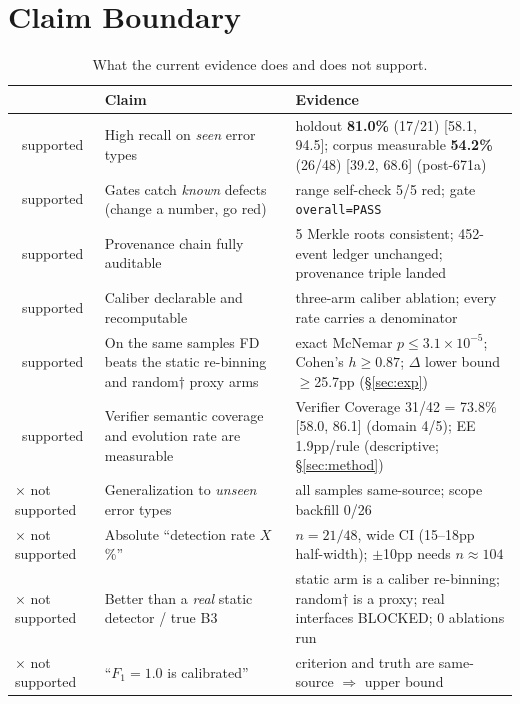 \documentclass{article}
\newcommand{\cmark}{\textcolor{green!60!black}{\checkmark}}
\begin{document}
\section{Claim Boundary}
\label{sec:claim}
\begin{table}[t]
\caption{What the current evidence does and does not support.}
\label{tab:claim}
\centering
\small
\begin{tabular}{@{}p{1.3cm}p{5.4cm}p{7.0cm}@{}}
\toprule
 & Claim & Evidence \\
\midrule
\cmark\ supported & High recall on \emph{seen} error types & holdout \textbf{81.0\%} (17/21) [58.1, 94.5]; corpus measurable \textbf{54.2\%} (26/48) [39.2, 68.6] (post-671a) \\
\cmark\ supported & Gates catch \emph{known} defects (change a number, go red) & range self-check 5/5 red; gate \texttt{overall=PASS} \\
\cmark\ supported & Provenance chain fully auditable & 5 Merkle roots consistent; 452-event ledger unchanged; provenance triple landed \\
\cmark\ supported & Caliber declarable and recomputable & three-arm caliber ablation; every rate carries a denominator \\
\cmark\ supported & On the same samples FD beats the static re-binning and random$\dagger$ proxy arms & exact McNemar $p\le3.1\times10^{-5}$; Cohen's $h\ge0.87$; $\Delta$ lower bound $\ge$25.7pp (\S\ref{sec:exp}) \\
\cmark\ supported & Verifier semantic coverage and evolution rate are measurable & Verifier Coverage 31/42 = 73.8\% [58.0, 86.1] (domain 4/5); EE 1.9pp/rule (descriptive; \S\ref{sec:method}) \\
\midrule
$\times$ not supported & Generalization to \emph{unseen} error types & all samples same-source; scope backfill 0/26 \\
$\times$ not supported & Absolute ``detection rate $X$\%'' & $n{=}21/48$, wide CI (15--18pp half-width); $\pm$10pp needs $n\approx104$ \\
$\times$ not supported & Better than a \emph{real} static detector / true B3 & static arm is a caliber re-binning; random$\dagger$ is a proxy; real interfaces BLOCKED; 0 ablations run \\
$\times$ not supported & ``$F_1{=}1.0$ is calibrated'' & criterion and truth are same-source $\Rightarrow$ upper bound \\

\end{tabular}
\end{table}
\end{document}
